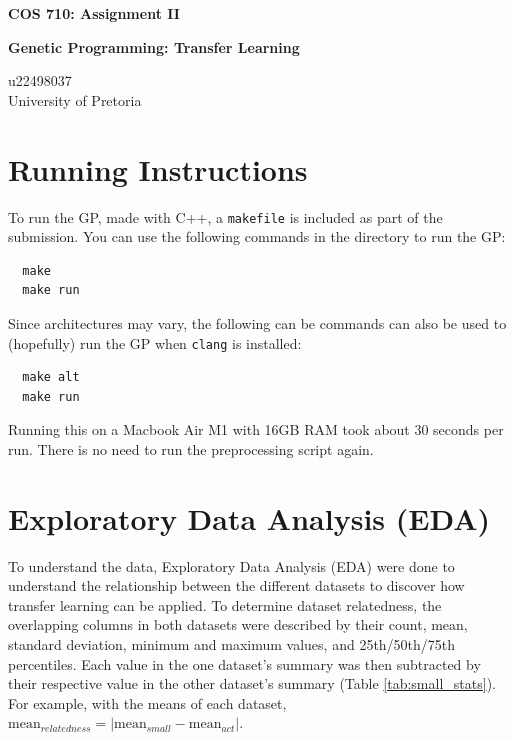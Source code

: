 \documentclass{article}
\begin{document}
\begin{titlepage}
\begin{center}


{\huge \textbf{COS 710: Assignment II}}

\vspace{1cm}

{\Large \textbf{Genetic Programming: Transfer Learning}}

\vspace{1cm}

{\large u22498037 \\
University of Pretoria}


\vfill

\end{center}
\end{titlepage}

\tableofcontents

\newpage

\section{Running Instructions}
To run the GP, made with C++, a \texttt{makefile} is included as part of the submission. You can use the following commands in the directory to run the GP:

\begin{verbatim}
  make
  make run
\end{verbatim}

Since architectures may vary, the following can be commands can also be used to (hopefully) run the GP when \texttt{clang} is installed: 

\begin{verbatim}
  make alt
  make run
\end{verbatim}

Running this on a Macbook Air M1 with 16GB RAM took about 30 seconds per run. There is no need to run the preprocessing script again.

\section{Exploratory Data Analysis (EDA)}
To understand the data, Exploratory Data Analysis (EDA) were done to understand the relationship between the different datasets to discover how transfer learning can be applied. To determine dataset relatedness, the overlapping columns in both datasets were described by their count, mean, standard deviation, minimum and maximum values, and 25th/50th/75th percentiles. Each value in the one dataset's summary was then subtracted by their respective value in the other dataset's summary (Table \ref{tab:small_stats}). For example, with the means of each dataset, \(\mbox{mean}_{relatedness} = |\mbox{mean}_{small} - \mbox{mean}_{act}|\).
\end{document}
